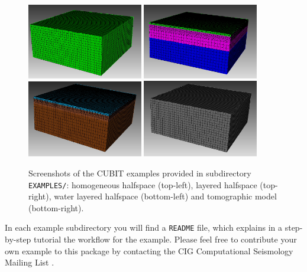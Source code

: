 \begin{figure}[htbp]
\begin{centering}
\includegraphics[width=0.45\textwidth]{figures/example-homogeneous.jpg}
\includegraphics[width=0.45\textwidth]{figures/example-2layers.jpg} \\
\includegraphics[width=0.45\textwidth]{figures/example-water.jpg}
\includegraphics[width=0.45\textwidth]{figures/example-tomo.jpg}
\par
\end{centering}
\caption{Screenshots of the CUBIT examples provided in subdirectory \texttt{EXAMPLES/}:
homogeneous halfspace (top-left), layered halfspace (top-right), water
layered halfspace (bottom-left) and tomographic model (bottom-right).}
\label{fig:examples.cubit}
\end{figure}


In each example subdirectory you will find a \texttt{README} file,
which explains in a step-by-step tutorial the workflow for the example.
Please feel free to contribute your own example to this package by
contacting the CIG Computational Seismology Mailing List .\\

